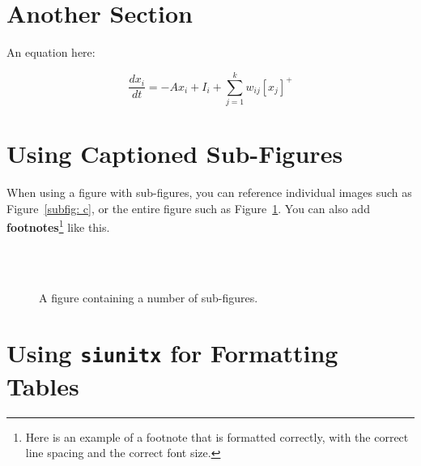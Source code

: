 	
	
\section{Another Section}

\lipsum[1] 
    
    An equation here:

    \begin{equation}\label{eq:shunting equation}
        \frac{dx_i}{dt} = -Ax_i + I_i + \sum_{j = 1}^{k} w_{ij}[x_j]^+
        \end{equation}



\section{Using Captioned Sub-Figures}

When using a figure with sub-figures, you can reference individual images such as Figure~\ref{subfig: c}, or the entire figure such as Figure~\ref{fig: some figures}. You can also add \textbf{footnotes}\footnote{Here is an example of a footnote that is formatted correctly, with the correct line spacing and the correct font size.} like this.


    \begin{figure} 
        \centering
        \hfill
        \\
        \hfill
        \\
        \hfill
      \caption[A shorter caption. ENSURE ALL FIGURES AND TABLES HAVE A SHORT CAPTION. Do not put references in the short caption, as this forces references to jump to the top of the references list unintentionally.]{A figure containing a number of sub-figures.}
      \label{fig: some figures} 
    \end{figure}

\section{Using \texttt{siunitx} for Formatting Tables}

